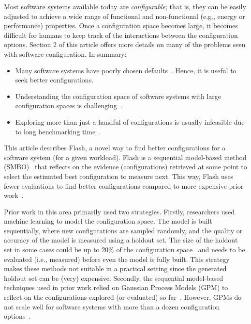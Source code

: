 \documentclass[10pt,journal,compsoc]{IEEEtran}
\newcommand{\flash}{{\sc Flash}\xspace}
\begin{document}
\noindent
Most software systems available today are {\em configurable}; that is, they can be easily adjusted to achieve
a wide range of functional and  non-functional (e.g., energy or
performance) properties.  Once a configuration space
becomes large, it becomes difficult for humans  to keep track of the interactions between the configuration
options. Section 2 of this article offers more details on many of the problems seen with software configuration. In summary:
\begin{itemize}[leftmargin=*]
\item Many software systems have poorly chosen defaults~\cite{van2017automatic,herodotou2011starfish}. Hence, it is useful to seek better configurations.
\item Understanding the configuration space of software systems with large configuration spaces is challenging~\cite{xu2015hey}.
\item Exploring more than just a handful of configurations is usually infeasible due to long benchmarking time~\cite{zhu2017optimized}.
\end{itemize}
This article describes \flash,  a novel way to find better configurations for a software system (for a given workload). 
\flash is
a sequential model-based method (SMBO)~\cite{alipourfard2017cherrypick, snoek2012practical, brochu2010tutorial}
that reflects
on the evidence (configurations) retrieved at some point to select the estimated best
configuration to measure next.
This way, \flash  uses fewer evaluations to find better configurations compared to more expensive prior work~\cite{guo2013variability, sarkar2015cost, nair17, nair2017using, guo2017data}.

Prior work in this area primarily used two strategies. Firstly, researchers used machine learning to model the configuration space. The model is built sequentially, where new configurations are sampled randomly, and the quality or accuracy of the model is measured using a holdout set. The size of the holdout set in some cases could be up to 20\% of the configuration space~\cite{nair2017using}  and needs to be evaluated (i.e., measured) before even the model is fully built. This strategy makes these methods not suitable in a practical setting since the generated holdout set can be (very) expensive. Secondly, the sequential model-based techniques used in prior work relied on Gaussian Process Models (GPM) to reflect on the configurations explored (or evaluated) so far~\cite{zuluaga2016varepsilon}. However, GPMs do not scale well for software systems with more than a dozen configuration options~\cite{wang2016bayesian}. 
\end{document}
